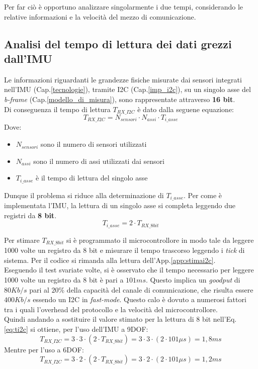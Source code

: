 Per far ciò è opportuno analizzare singolarmente i due tempi, considerando le relative informazioni e la velocità del mezzo di comunicazione.\\

\subsection{Analisi del tempo di lettura dei dati grezzi dall'IMU}
\label{analisii2c}
Le informazioni riguardanti le grandezze fisiche misurate dai sensori integrati nell'IMU (Cap.\ref{tecnologie}), tramite I2C (Cap.\ref{imp_i2c}), su un singolo asse del \textit{b-frame} (Cap.\ref{modello_di_misura}), sono rappresentate attraverso \textbf{16 bit}.\\
Di conseguenza il tempo di lettura $T_{RX\_I2C}$ è dato dalla seguene equazione:
\begin{equation}
\label{eq:ti2c}
	T_{RX\_I2C} = N_{sensori} \cdot N_{assi} \cdot T_{i\_asse}
\end{equation}
Dove:
\begin{itemize}
	\item $N_{sensori}$ sono il numero di sensori utilizzati 
	\item $N_{assi}$ sono il numero di assi utilizzati dai sensori
	\item $ T_{i\_asse}$ è il tempo di lettura del singolo asse
\end{itemize}

Dunque il problema si riduce alla determinazione di $ T_{i\_asse}$. Per come è implementata l'IMU, la lettura di un singolo asse si completa leggendo due registri da \textbf{8 bit}.
\begin{equation}
 T_{i\_asse} = 2 \cdot T_{RX\_8bit}
\end{equation}

Per stimare $T_{RX\_8bit}$ si è programmato il microcontrollore in modo tale da leggere 1000 volte un registro da 8 bit e misurare il tempo trascorso leggendo i \textit{tick} di sistema. Per il codice si rimanda alla lettura dell'App.\ref{app:stimai2c}.\\ 
Eseguendo il test svariate volte, si è osservato che il tempo necessario per leggere 1000 volte un registro da 8 bit è pari a $101 ms$. 
Questo implica un \textit{goodput} di $80 Kb/s$ pari al $20\%$ della capacità del canale di comunicazione, che risulta essere $400 Kb/s$ essendo un I2C in \textit{fast-mode}. Questo calo è dovuto a numerosi fattori tra i quali l'overhead del protocollo e la velocità del microcontrollore.\\
Quindi andando a sostituire il valore stimato per la lettura di 8 bit nell'Eq.\ref{eq:ti2c} si ottiene, per l'uso dell'IMU a 9DOF:
\begin{equation}
T_{RX\_I2C} = 3 \cdot 3 \cdot (2 \cdot T_{RX\_8bit}) = 3 \cdot 3 \cdot (2 \cdot 101\mu s )= 1,8 ms
\end{equation}
Mentre per l'uso a 6DOF:
\begin{equation}
T_{RX\_I2C} = 3 \cdot 2 \cdot (2 \cdot T_{RX\_8bit}) = 3 \cdot 2 \cdot (2 \cdot 101\mu s )= 1,2 ms
\end{equation}


